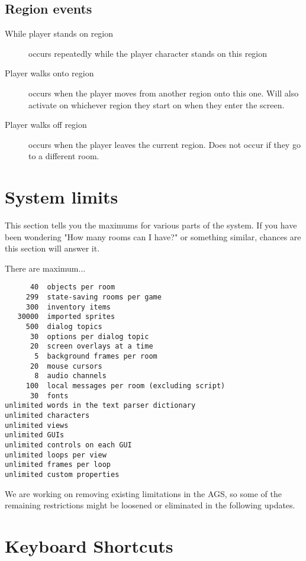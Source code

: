 \subsection{Region events}%

\begin{description}
\item [While player stands on region] occurs repeatedly while the player character stands on this region
\item [Player walks onto region] occurs when the player moves from another region onto this one. Will
  also activate on whichever region they start on when they enter the screen.
\item [Player walks off region] occurs when the player leaves the current region. Does not occur
  if they go to a different room.
\end{description}



\section{System limits}%

This section tells you the maximums for various parts of the system. If you
have been wondering "How many rooms can I have?" or something similar,
chances are this section will answer it.

There are maximum...
\begin{verbatim}
      40  objects per room
     299  state-saving rooms per game
     300  inventory items
   30000  imported sprites
     500  dialog topics
      30  options per dialog topic
      20  screen overlays at a time
       5  background frames per room
      20  mouse cursors
       8  audio channels
     100  local messages per room (excluding script)
      30  fonts
unlimited words in the text parser dictionary
unlimited characters
unlimited views
unlimited GUIs
unlimited controls on each GUI
unlimited loops per view
unlimited frames per loop
unlimited custom properties
\end{verbatim}

We are working on removing existing limitations in the AGS, so some of the remaining
restrictions might be loosened or eliminated in the following updates.

\section{Keyboard Shortcuts}\label{KeyboardShortcuts}%

